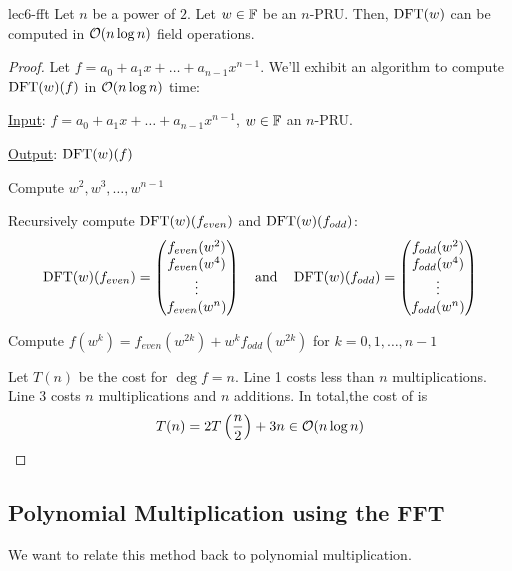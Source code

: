 \begin{theorem}{}{lec6-fft}
    Let $n$ be a power of $2$. Let $w \in \operatorname{\mathbb{F}}$ be an $n$-PRU. Then, $\operatorname{DFT}(w)$ can be computed in $\operatorname{\mathcal{O}}(n\log n)$ field operations.
\end{theorem}
\begin{proof}
Let $f = a_0 + a_1x + \ldots + a_{n-1}x^{n-1}$.
We'll exhibit an algorithm to compute $\operatorname{DFT}(w)(f)$ in $\operatorname{\mathcal{O}}(n\log n)$ time:

\begin{algorithm}[H]
    \caption{Fast Fourier Transform (FFT)}\label{lec6:alg-fft}

    \ul{Input}: $f = a_0 + a_1x + \ldots + a_{n-1}x^{n-1}$, $w \in \operatorname{\mathbb{F}}$ an $n$-PRU.
    
    \ul{Output}: $\operatorname{DFT}(w)(f)$
    
    \BlankLine
    \nl Compute $w^2, w^3, \ldots, w^{n-1}$

    \nl Recursively compute $\operatorname{DFT}(w)(f_{even})$ and $\operatorname{DFT}(w)(f_{odd})$:
    \begin{equation*}
        \operatorname{DFT}(w)(f_{even}) = 
        \begin{pmatrix}
            f_{even}(w^2) \\ f_{even}(w^4) \\ \vdots \\ f_{even}(w^{n})
        \end{pmatrix}
        \quad\text{and}\quad
        \operatorname{DFT}(w)(f_{odd}) =
        \begin{pmatrix}
            f_{odd}(w^2) \\ f_{odd}(w^4) \\ \vdots \\ f_{odd}(w^{n})
        \end{pmatrix}
    \end{equation*}

    \nl Compute $f(w^k) = f_{even}(w^{2k}) + w^kf_{odd}(w^{2k})$ for $k = 0, 1, \ldots, n - 1$
\end{algorithm}

Let $T(n)$ be the cost for $\deg f = n$. 
Line 1 costs less than $n$ multiplications.
Line 3 costs $n$ multiplications and $n$ additions.
In total,the cost of  is
\begin{equation*}
    T(n) = 2T\left(\frac{n}{2}\right) + 3n \in \operatorname{\mathcal{O}}(n\log n)
\end{equation*} 
\end{proof}

\subsection{Polynomial Multiplication using the FFT}
We want to relate this method back to polynomial multiplication.

